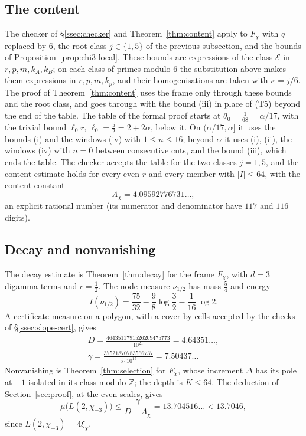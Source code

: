 \documentclass[11pt]{amsart}
\theoremstyle{definition}
\theoremstyle{remark}
\numberwithin{equation}{section}
\newcommand{\Z}{\mathbb Z}
\newcommand{\MuChi}{13.7046}
\newcommand{\MuChiExact}{13.704516}
\begin{document}
\subsection{The content}
The checker of \S\ref{ssec:checker} and Theorem~\ref{thm:content} apply to $F_\chi$ with $q$ replaced by $6$, the root
class $j\in\{1,5\}$ of the previous subsection, and the bounds of Proposition~\ref{prop:chi3-local}. These bounds are
expressions of the class $\mathcal E$ in $r,p,m,k_A,k_B$; on each class of primes modulo $6$ the substitution above makes
them expressions in $r,p,m,k_p$, and their homogenisations are taken with $\kappa=j/6$. The proof of
Theorem~\ref{thm:content} uses the frame only through these bounds and the root class, and goes through with the bound
(iii) in place of (T5) beyond the end of the table. The table of the formal proof starts at $\theta_0=\frac1{68}=\alpha/17$, with the trivial bound $\ell_0r$, $\ell_0=\frac52=2+2\alpha$,
below it. On $(\alpha/17,\alpha]$ it uses the bounds (i) and the windows (iv) with $1\le n\le16$; beyond $\alpha$ it uses
(i), (ii), the windows (iv) with $n=0$ between consecutive cuts, and the bound (iii), which ends the table. The checker
accepts the table for the two classes $j=1,5$, and the content estimate holds for every even $r$ and every member with
$|I|\le64$, with the content constant
\[
 \Lambda_\chi=4.09592776731\ldots,
\]
an explicit rational number (its numerator and denominator have $117$ and $116$ digits).

\subsection{Decay and nonvanishing}
The decay estimate is Theorem~\ref{thm:decay} for the frame $F_\chi$, with $d=3$ digamma terms and $c=\frac12$. The node
measure $\nu_{1/2}$ has mass $\frac54$ and energy
\[
 I(\nu_{1/2})=\frac{75}{32}-\frac98\log\frac32-\frac1{16}\log2 .
\]
A certificate measure on a polygon, with a cover by cells accepted by the checks of \S\ref{ssec:slope-cert}, gives
\[
\begin{gathered}
 D=\frac{4643511791526209475773}{10^{21}}=4.64351\ldots,\\ \gamma=\frac{37521870783566737}{5\cdot10^{15}}=7.50437\ldots
\end{gathered}
\]
Nonvanishing is Theorem~\ref{thm:selection} for $F_\chi$, whose increment $\Delta$ has its pole at $-1$ isolated in its
class modulo $\Z$; the depth is $K\le64$. The deduction of Section~\ref{sec:proof}, at the even scales, gives
\[
 \mu\bigl(L(2,\chi_{-3})\bigr)\le\frac\gamma{D-\Lambda_\chi}=\MuChiExact\ldots<\MuChi,
\]
since $L(2,\chi_{-3})=4\xi_\chi$.
\end{document}
